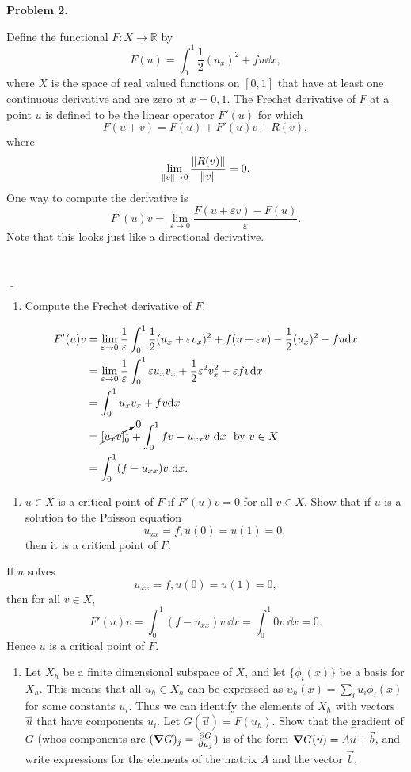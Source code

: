 \documentclass[12pt]{article}
\newcommand{\E}{\varepsilon}
\def\R{\mathbb{R}}
\newenvironment{myprob}[1]
    {%
    \noindent{\Huge$\ulcorner$}\textbf{#1.}\begin{em}
    }
    { 
    \end{em} \\ \hphantom{l} \hfill {\Huge$\lrcorner$} }
\begin{document}
\begin{myprob}{Problem 2}
Define the functional $F: X \to \R$ by
$$F(u) = \int_0^1 \dfrac{1}{2}(u_x)^2 + fu \dd x,$$
where $X$ is the space of real valued functions on $[0,1]$ that have at least one continuous derivative and are zero at $x=0,1$.  The Frechet derivative of $F$ at a point $u$ is defined to be the linear operator $F'(u)$ for which $$F(u+v) = F(u)+F'(u)v + R(v),$$
where $$\lim_{\norm{v}\to0} \dfrac{ \norm{R(v)}}{\norm{v}} = 0.$$
One way to compute the derivative is $$F'(u)v = \lim_{\E \to 0} \dfrac{F(u+\E v)-F(u)}{\E}.$$
Note that this looks just like a directional derivative.
\end{myprob}
\begin{enumerate}[ \ \ (a)]
\item Compute the Frechet derivative of $F$.
\end{enumerate}

\begin{align*}
F'(u)v &= \lim_{\E\to0}\dfrac{1}{\E} \int_0^1 \dfrac{1}{2}(u_x + \E v_x)^2 + f(u+\E v) - \dfrac{1}{2}(u_x)^2 - fu \dd x \\
&= \lim_{\E\to0} \dfrac{1}{\E} \int_0^1 \E u_x v_x + \dfrac{1}{2}\E^2 v_x^2 + \E f v \dd x \\
&= \int_0^1 u_x v_x + f v \dd x \\
&= \cancelto{0}{[u_x v]_0^1} + \int_0^1 fv - u_{xx}v \ \dd x \ \ \text{by $v \in X$} \\
&= \int_0^1 (f - u_{xx}) v \ \dd x.
\end{align*} 

\begin{enumerate}[ \ \ (b)]
\item $u \in X$ is a critical point of $F$ if $F'(u)v = 0$
for all $v \in X$. Show that if $u$ is a solution to
the Poisson equation
$$u_{xx} = f, u(0) = u(1) = 0,$$
then it is a critical point of $F$.
\end{enumerate}

If $u$ solves $$u_{xx} = f, u(0) = u(1) = 0,$$ then for all $v \in X$,
$$F'(u)v = \int_0^1 (f-u_{xx})v \ \dd x = \int_0^1 0 v \ \dd x = 0.$$
Hence $u$ is a critical point of $F$.

\begin{enumerate}[ \ \ (c)]
\item   Let $X_h$ be a finite dimensional subspace of $X$, and let $\{\phi_i(x)\}$ be a basis for $X_h$.  This means that all $u_h \in X_h$ can be expressed as $u_h(x) = \sum_iu_i\phi_i(x)$ for some constants $u_i$.  Thus we can identify the elements of $X_h$ with vectors $\vec{u}$ that have components $u_i$.  Let $G(\vec{u}) = F(u_h)$.  Show that the gradient of $G$ (whos components are $(\grad G)_j = \frac{\partial G}{\partial u_j})$ is of the form $\grad G(\vec{u}) = A\vec{u} + \vec{b}$, and write expressions for the elements of the matrix $A$ and the vector $\vec{b}$.
\end{enumerate}
\end{document}
